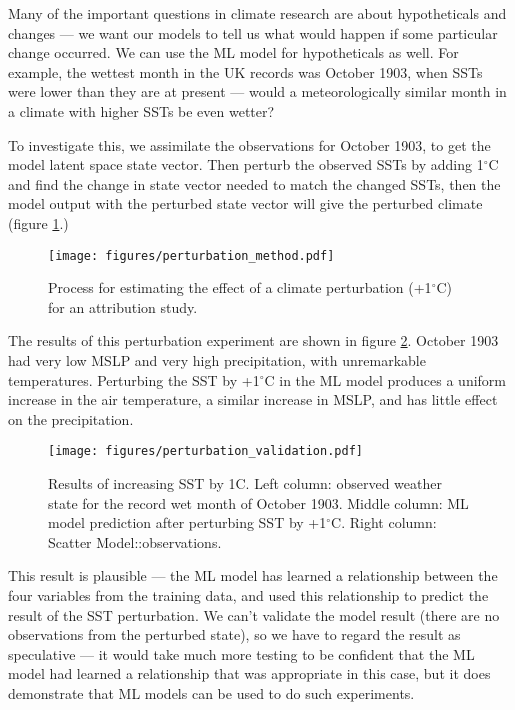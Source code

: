 \documentclass[gmd]{copernicus}
\begin{document}
Many of the important questions in climate research are about hypotheticals and changes --- we want our models to tell us what would happen if some particular change occurred. We can use the ML model for hypotheticals as well. For example, the wettest month in the UK records was October 1903, when SSTs were lower than they are at present --- would a meteorologically similar month in a climate with higher SSTs be even wetter?

To investigate this, we assimilate the observations for October 1903, to get the model latent space state vector. Then perturb the observed SSTs by adding 1$^\circ$C and find the change in state vector needed to match the changed SSTs, then the model output with the perturbed state vector will give the perturbed climate (figure \ref{perturbation_method}.)

\begin{figure}[h]
\texttt{[image: figures/perturbation\_method.pdf]}
\caption{Process for estimating the effect of a climate perturbation (+1$^\circ$C) for an attribution study.}
\label{perturbation_method}
\end{figure}

The results of this perturbation experiment are shown in figure \ref{perturbation_validation}. October 1903 had very low MSLP and very high precipitation, with unremarkable temperatures. Perturbing the SST by +1$^\circ$C in the ML model produces a uniform increase in the air temperature, a similar increase in MSLP, and has little effect on the precipitation. 

\begin{figure}[h]
\texttt{[image: figures/perturbation\_validation.pdf]}
\caption{Results of increasing SST by 1C. Left column: observed weather state for the record wet month of October 1903. Middle column: ML model prediction after perturbing SST by +1$^\circ$C. Right column: Scatter Model::observations.}
\label{perturbation_validation}
\end{figure}
        
This result is plausible --- the ML model has learned a relationship between the four variables from the training data, and used this relationship to predict the result of the SST perturbation. We can't validate the model result (there are no observations from the perturbed state), so we have to regard the result as speculative --- it would take much more testing to be confident that the ML model had learned a relationship that was appropriate in this case, but it does demonstrate that ML models can be used to do such experiments.
\end{document}
